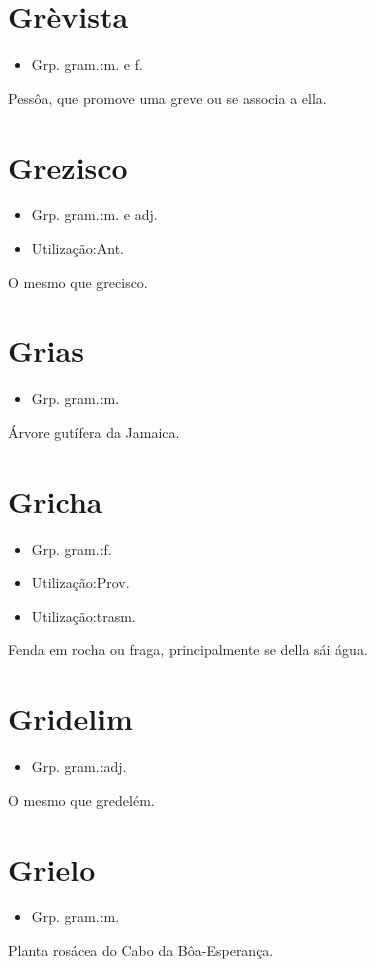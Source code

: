 \section{Grèvista}
\begin{itemize}
\item {Grp. gram.:m.  e  f.}
\end{itemize}
Pessôa, que promove uma greve ou se associa a ella.
\section{Grezisco}
\begin{itemize}
\item {Grp. gram.:m.  e  adj.}
\end{itemize}
\begin{itemize}
\item {Utilização:Ant.}
\end{itemize}
O mesmo que \textunderscore grecisco\textunderscore .
\section{Grias}
\begin{itemize}
\item {Grp. gram.:m.}
\end{itemize}
Árvore gutífera da Jamaica.
\section{Gricha}
\begin{itemize}
\item {Grp. gram.:f.}
\end{itemize}
\begin{itemize}
\item {Utilização:Prov.}
\end{itemize}
\begin{itemize}
\item {Utilização:trasm.}
\end{itemize}
Fenda em rocha ou fraga, principalmente se della sái água.
\section{Gridelim}
\begin{itemize}
\item {Grp. gram.:adj.}
\end{itemize}
O mesmo que \textunderscore gredelém\textunderscore .
\section{Grielo}
\begin{itemize}
\item {Grp. gram.:m.}
\end{itemize}
Planta rosácea do Cabo da Bôa-Esperança.
